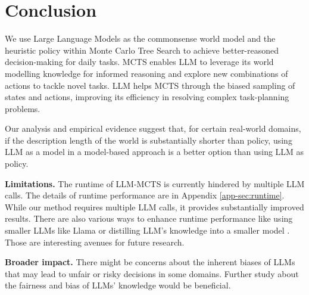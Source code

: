 \section{Conclusion}\label{sec:conclusion}


We use Large Language Models as the commonsense world model and the heuristic policy within Monte Carlo Tree Search to achieve better-reasoned decision-making for daily tasks. MCTS enables LLM to leverage its world modelling knowledge for informed reasoning and explore new combinations of actions to tackle novel tasks. LLM helps MCTS through the biased sampling of states and actions, improving its efficiency in resolving complex task-planning problems. 
{
Our analysis and empirical evidence suggest that, for certain real-world domains, if the description length of the world is substantially shorter than policy, using LLM as a model in a model-based approach is a better option than using LLM as policy. 

\textbf{Limitations.} The runtime of LLM-MCTS is currently hindered by multiple LLM calls. The details of runtime performance are in Appendix \ref{app-sec:runtime}. %
While our method requires multiple LLM calls, it provides substantially improved results. There are also various ways to enhance runtime performance like using smaller LLMs like Llama \cite{touvron2023llama, touvron2023llama2} or distilling LLM's knowledge into a smaller model \cite{shridhar2023distilling, hsieh-etal-2023-distilling, liang2023less}. Those are interesting avenues for future research.

\textbf{Broader impact.} There might be concerns about the inherent biases of LLMs that may lead to unfair or risky decisions in some domains. Further study about the fairness and bias of LLMs' knowledge would be beneficial.  
}




